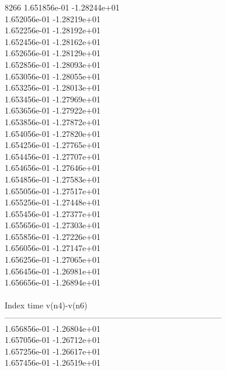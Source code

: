 8266	1.651856e-01	-1.28244e+01	\\ 	1.652056e-01	-1.28219e+01	\\ 	1.652256e-01	-1.28192e+01	\\ 	1.652456e-01	-1.28162e+01	\\ 	1.652656e-01	-1.28129e+01	\\ 	1.652856e-01	-1.28093e+01	\\ 	1.653056e-01	-1.28055e+01	\\ 	1.653256e-01	-1.28013e+01	\\ 	1.653456e-01	-1.27969e+01	\\ 	1.653656e-01	-1.27922e+01	\\ 	1.653856e-01	-1.27872e+01	\\ 	1.654056e-01	-1.27820e+01	\\ 	1.654256e-01	-1.27765e+01	\\ 	1.654456e-01	-1.27707e+01	\\ 	1.654656e-01	-1.27646e+01	\\ 	1.654856e-01	-1.27583e+01	\\ 	1.655056e-01	-1.27517e+01	\\ 	1.655256e-01	-1.27448e+01	\\ 	1.655456e-01	-1.27377e+01	\\ 	1.655656e-01	-1.27303e+01	\\ 	1.655856e-01	-1.27226e+01	\\ 	1.656056e-01	-1.27147e+01	\\ 	1.656256e-01	-1.27065e+01	\\ 	1.656456e-01	-1.26981e+01	\\ 	1.656656e-01	-1.26894e+01	\\ \hline
\\ \hline
Index   time            v(n4)-v(n6)     \\ \hline
--------------------------------------------------------------------------------\\ 	1.656856e-01	-1.26804e+01	\\ 	1.657056e-01	-1.26712e+01	\\ 	1.657256e-01	-1.26617e+01	\\ 	1.657456e-01	-1.26519e+01	\\ \hline

